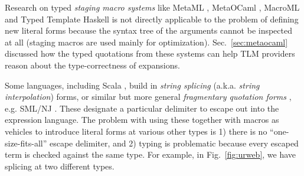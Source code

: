 \documentclass[acmsmall,screen]{acmart}
\begin{document}
Research on typed \emph{staging macro systems} \cite{DBLP:conf/popl/DaviesP96} like MetaML \cite{Sheard:1999:UMS}, MetaOCaml \cite{DBLP:conf/flops/Kiselyov14}, MacroML \cite{ganz2001macros,DBLP:conf/gpce/TahaJ03} and Typed Template Haskell \cite{tth} is not directly applicable to the problem of defining new literal forms because the syntax tree of the arguments cannot be inspected at all (staging macros are used mainly for optimization). Sec.~\ref{sec:metaocaml} discussed how the typed quotations from these systems can help TLM providers reason about the type-correctness of expansions.%


  Some languages, including Scala \cite{odersky2008programming}, build in \emph{string splicing} (a.k.a. \emph{string interpolation}) forms, or similar but more general \emph{fragmentary quotation forms} \cite{conf/icfp/Slind91}, e.g. SML/NJ \cite{SML/Quote}. These designate a particular delimiter to escape out into the expression language. The problem with using these together with macros as vehicles to introduce literal forms at various other types is 1) there is no ``one-size-fits-all'' escape delimiter, and 2) typing is problematic because every escaped term is checked against the same type. For example, in Fig.~\ref{fig:urweb}, we have splicing at two different types. %
\end{document}
